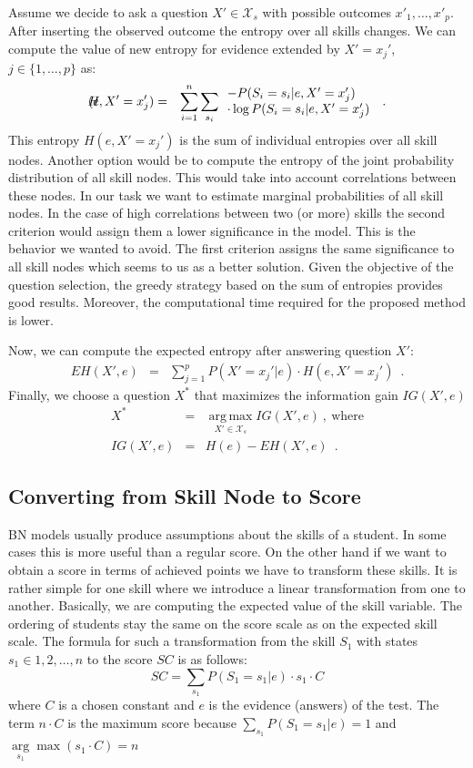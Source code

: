 Assume we decide to ask a question $X' \in \mathcal{X}_s$ with possible outcomes $x'_1,\ldots,x'_p$. 
After inserting the observed outcome the entropy over all skills changes. 
We can compute the value of new entropy for evidence extended by $X' = x_j'$, $j \in \{1,\ldots,p\}$ as:
\begin{eqnarray*}
\lefteqn H(e,X'=x_j') & = & \sum_{i =1}^n \sum_{s_i} \begin{array}{ll}
-P(S_i=s_i|e,X'=x_j')\\
\cdot \log P(S_i=s_i|e,X'=x_j') 
\end{array}\enspace .
\end{eqnarray*}
This entropy $H(e,X'=x_j')$ is the sum of individual entropies over all skill nodes. Another option would be to compute the entropy of the joint probability distribution of all skill nodes. This would take into account correlations between these nodes. In our task we want to estimate marginal probabilities of all skill nodes. In the case of high correlations between two (or more) skills the second criterion would assign them a lower significance in the model. This is the behavior we wanted to avoid. The first criterion assigns the same significance to all skill nodes which seems to us as a better solution. Given the objective of the question selection, the greedy strategy based on the sum of entropies provides good results. Moreover, the computational time required for the proposed method is lower.

Now, we can compute the expected entropy after answering question $X'$: 
\begin{eqnarray*}
EH(X',e) & = & \sum_{j=1}^p P(X'=x_j'|e) \cdot H(e,X'=x_j') \enspace .
\end{eqnarray*}
Finally, we choose a question $X^*$ that maximizes the information gain $IG(X',e)$
\begin{eqnarray*}
X^* & = & \operatorname*{arg\,max}_{X' \in \mathcal{X}_s} IG(X',e) \ , \ \mbox{where}\\
IG(X',e) & = & H(e)  - EH(X',e) \enspace .
\end{eqnarray*}


\subsection{Converting from Skill Node to Score}
\label{sec:converting_skill}
BN models usually produce assumptions about the skills of a student. In some cases this is more useful than a regular score. On the other hand if we want to obtain a score in terms of achieved points we have to transform these skills. It is rather simple for one skill where we introduce a linear transformation from one to another. Basically, we are computing the expected value of the skill variable. The ordering of students stay the same on the score scale as on the expected skill scale. The formula for such a transformation from the skill $S_1$ with states $s_1 \in {1,2,\ldots,n}$ to the score $SC$ is as follows:
$$SC = \sum_{s_1}{P(S_1=s_1|e)\cdot s_1\cdot C} $$
where $C$ is a chosen constant and $e$ is the evidence (answers) of the test. The term $n\cdot C$ is the maximum score because $\sum_{s_1}{P(S_1=s_1|e)} = 1$ and $\underset{s_1}\arg \max (s_1\cdot C) = n$

